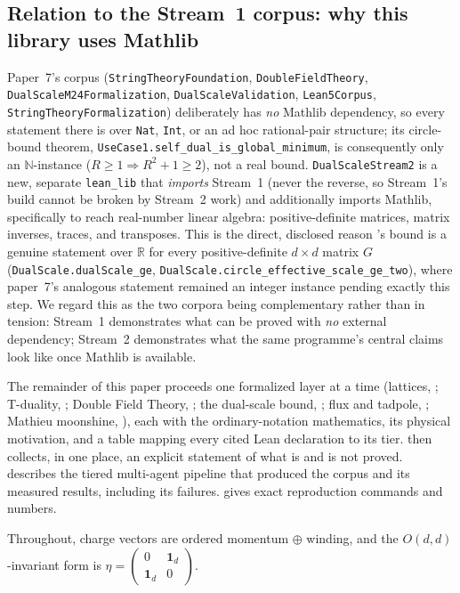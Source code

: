\documentclass[11pt,a4paper]{article}
\theoremstyle{remark}
\begin{document}
\subsection{Relation to the Stream~1 corpus: why this library uses Mathlib}
Paper~7's corpus (\texttt{StringTheoryFoundation}, \texttt{DoubleFieldTheory},
\texttt{DualScaleM24Formalization}, \texttt{DualScaleValidation}, \texttt{Lean5Corpus},
\texttt{StringTheoryFormalization}) deliberately has \emph{no} Mathlib dependency, so every
statement there is over \texttt{Nat}, \texttt{Int}, or an ad hoc rational-pair structure; its
circle-bound theorem, \texttt{UseCase1.self\_dual\_is\_global\_minimum}, is consequently only an
$\mathbb{N}$-instance ($R\ge 1\Rightarrow R^2+1\ge 2$), not a real bound. \texttt{DualScaleStream2}
is a new, separate \texttt{lean\_lib} that \emph{imports} Stream~1 (never the reverse, so
Stream~1's build cannot be broken by Stream~2 work) and additionally imports Mathlib, specifically
to reach real-number linear algebra: positive-definite matrices, matrix inverses, traces, and
transposes. This is the direct, disclosed reason 's bound is a genuine
statement over $\mathbb{R}$ for every positive-definite $d\times d$ matrix $G$
(\texttt{DualScale.dualScale\_ge}, \texttt{DualScale.circle\_effective\_scale\_ge\_two}), where
paper~7's analogous statement remained an integer instance pending exactly this step. We regard
this as the two corpora being complementary rather than in tension: Stream~1 demonstrates what
can be proved with \emph{no} external dependency; Stream~2 demonstrates what the same
programme's central claims look like once Mathlib is available.

The remainder of this paper proceeds one formalized layer at a time (lattices,
; T-duality, ; Double Field Theory,
; the dual-scale bound, ; flux and tadpole,
; Mathieu moonshine, ), each with the ordinary-notation
mathematics, its physical motivation, and a table mapping every cited Lean declaration to its
tier.  then collects, in one place, an explicit statement of what is and is not
proved.  describes the tiered multi-agent pipeline that produced the corpus and
its measured results, including its failures.  gives exact reproduction
commands and numbers.

Throughout, charge vectors are ordered momentum $\oplus$ winding, and the $O(d,d)$-invariant form
is $\eta=\begin{pmatrix}0 & \mathbf{1}_d\\ \mathbf{1}_d & 0\end{pmatrix}$.
\end{document}
